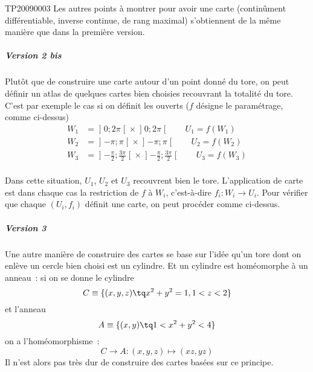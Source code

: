 \begin{corrige}{TP20090003}
	Les autres points à montrer pour avoir une carte (continûment
	différentiable, inverse continue, de rang maximal) s'obtiennent de la
	même manière que dans la première version.

	\subparagraph{Version 2 bis}Plutôt que de construire une carte autour
	d'un point donné du tore, on peut définir un atlas de quelques cartes
	bien choisies recouvrant la totalité du tore. C'est par exemple le cas
	si on définit les ouverts ($f$ désigne le paramétrage, comme ci-dessus)
	\begin{equation*}
		\begin{split}
			W_1 & = \mathopen]0; 2 \pi\mathclose[ \times \mathopen]0; 2
			\pi\mathclose[ \qquad U_1 = f(W_1)                                                 \\
			W_2 & = \mathopen]-\pi; \pi\mathclose[ \times \mathopen]-\pi;
			\pi\mathclose[ \qquad U_2 = f(W_2)                                                 \\
			W_3 & = \mathopen]-\frac\pi2; \frac{3\pi}2\mathclose[ \times \mathopen]-\frac\pi2;
			\frac{3\pi}2\mathclose[ \qquad U_3 = f(W_3)                                        \\
		\end{split}
	\end{equation*}

	Dans cette situation, $U_1$, $U_2$ et $U_3$ recouvrent bien le
	tore. L'application de carte est dans chaque cas la restriction de $f$
	à $W_i$, c'est-à-dire $f_i : W_i \to
		U_i$. Pour vérifier que chaque $(U_i,f_i)$ définit une carte, on peut
	procéder comme ci-dessus.

	\subparagraph{Version 3}
	Une autre manière de construire des cartes se base sur l'idée qu'un
	tore dont on enlève un cercle bien choisi est un cylindre. Et un
	cylindre est homéomorphe à un anneau~: si on se donne le cylindre
	\begin{equation*}
		C \equiv \{ (x,y,z) \tq x^2 + y^2 = 1, 1 < z < 2 \}
	\end{equation*}
	et l'anneau
	\begin{equation*}
		A \equiv \{ (x,y) \tq 1 < x^2 + y^2 < 4 \}
	\end{equation*}
	on a l'homéomorphisme~:
	\begin{equation*}
		C \to A : (x,y,z) \mapsto (x z, y z)
	\end{equation*}
	Il n'est alors pas très dur de construire des cartes basées sur ce
	principe.


\end{corrige}
